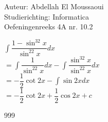 \documentclass[a4paper]{article}
\begin{document}
  
\noindent \large Auteur: Abdellah El Moussaoui \\
\noindent \large Studierichting: Informatica\\
\noindent \large Oefeningenreeks 4A nr. 10.2\\

\medskip

\normalsize

$\displaystyle\int \dfrac{1-\sin^32x}{\sin^22x}dx$\\

$=\displaystyle\int \dfrac{1}{\sin^22x}dx - \displaystyle\int \dfrac{\sin^32x}{\sin^22x}dx$\\

$=-\dfrac{1}{2}\cot2x - \displaystyle\int \sin2xdx$\\

$=-\dfrac{1}{2}\cot2x + \dfrac{1}{2} \cos2x+c$\\


\begin{thebibliography}{999}
\end{thebibliography}
\end{document}
